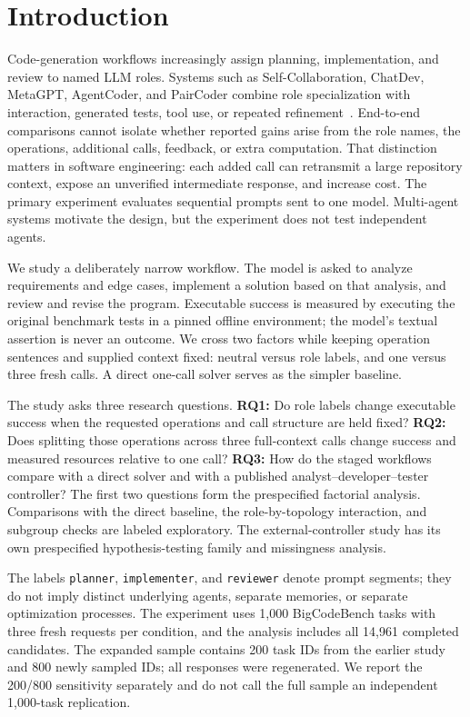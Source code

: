 \section{Introduction}
Code-generation workflows increasingly assign planning, implementation, and review to named LLM roles. Systems such as Self-Collaboration, ChatDev, MetaGPT, AgentCoder, and PairCoder combine role specialization with interaction, generated tests, tool use, or repeated refinement~\cite{dong2023selfcollaboration,qian2024chatdev,hong2024metagpt,huang2023agentcoder,zhang2024paircoder}. End-to-end comparisons cannot isolate whether reported gains arise from the role names, the operations, additional calls, feedback, or extra computation. That distinction matters in software engineering: each added call can retransmit a large repository context, expose an unverified intermediate response, and increase cost. The primary experiment evaluates sequential prompts sent to one model. Multi-agent systems motivate the design, but the experiment does not test independent agents.

We study a deliberately narrow workflow. The model is asked to analyze requirements and edge cases, implement a solution based on that analysis, and review and revise the program. Executable success is measured by executing the original benchmark tests in a pinned offline environment; the model's textual assertion is never an outcome. We cross two factors while keeping operation sentences and supplied context fixed: neutral versus role labels, and one versus three fresh calls. A direct one-call solver serves as the simpler baseline.

The study asks three research questions. \textbf{RQ1:} Do role labels change executable success when the requested operations and call structure are held fixed? \textbf{RQ2:} Does splitting those operations across three full-context calls change success and measured resources relative to one call? \textbf{RQ3:} How do the staged workflows compare with a direct solver and with a published analyst--developer--tester controller? The first two questions form the prespecified factorial analysis. Comparisons with the direct baseline, the role-by-topology interaction, and subgroup checks are labeled exploratory. The external-controller study has its own prespecified hypothesis-testing family and missingness analysis.

The labels \texttt{planner}, \texttt{implementer}, and \texttt{reviewer} denote prompt segments; they do not imply distinct underlying agents, separate memories, or separate optimization processes. The experiment uses 1,000 BigCodeBench tasks with three fresh requests per condition, and the analysis includes all 14,961 completed candidates. The expanded sample contains 200 task IDs from the earlier study and 800 newly sampled IDs; all responses were regenerated. We report the 200/800 sensitivity separately and do not call the full sample an independent 1,000-task replication.

